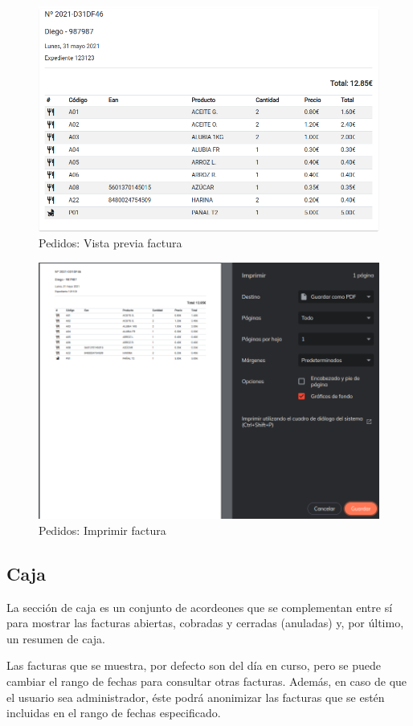 \clearpage
\begin{figure}[h]
\centering
\includegraphics[scale=0.47]{archivos/maquetacion-factura.png}
\caption{Pedidos: Vista previa factura}
\label{fig:pedidos_invoice_preview}
\end{figure}
\clearpage
\begin{figure}[h]
\centering
\includegraphics[scale=0.47]{archivos/imprimir-factura.png}
\caption{Pedidos: Imprimir factura}
\label{fig:pedidos_invoice_print}
\end{figure}
\clearpage
\subsection{Caja}
La sección de caja es un conjunto de acordeones que se complementan entre sí para mostrar las facturas abiertas, cobradas y cerradas (anuladas) y, por último, un resumen de caja.
\vspace{1em}
\par Las facturas que se muestra, por defecto son del día en curso, pero se puede cambiar el rango de fechas para consultar otras facturas. Además, en caso de que el usuario sea administrador, éste podrá anonimizar las facturas que se estén incluidas en el rango de fechas especificado.

